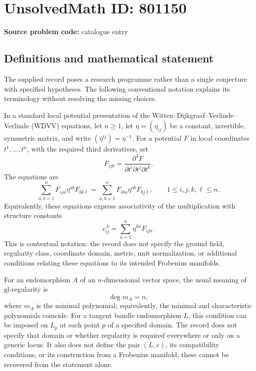 \documentclass[11pt]{article}
\begin{document}
\section*{UnsolvedMath ID: 801150}
\textbf{Source problem code:} catalogue entry
\subsection{Definitions and mathematical statement}
The supplied record poses a research programme rather than a single conjecture with specified hypotheses. The following conventional notation explains its terminology without resolving the missing choices.

In a standard local potential presentation of the Witten--Dijkgraaf--Verlinde--Verlinde (WDVV) equations, let \(n\geq 1\), let \(\eta=(\eta_{ij})\) be a constant, invertible, symmetric matrix, and write \((\eta^{ij})=\eta^{-1}\). For a potential \(F\) in local coordinates \(t^1,\ldots,t^n\), with the required third derivatives, set
\[
F_{ijk}=\frac{\partial^3 F}{\partial t^i\partial t^j\partial t^k}.
\]
The equations are
\[
\sum_{a,b=1}^{n}F_{ija}\eta^{ab}F_{bk\ell}
=
\sum_{a,b=1}^{n}F_{ika}\eta^{ab}F_{bj\ell},
\qquad 1\leq i,j,k,\ell\leq n.
\]
Equivalently, these equations express associativity of the multiplication with structure constants
\[
c_{ij}^{\ k}=\sum_{a=1}^{n}\eta^{ka}F_{ija}.
\]
This is contextual notation: the record does not specify the ground field, regularity class, coordinate domain, metric, unit normalization, or additional conditions relating these equations to its intended Frobenius manifolds.

For an endomorphism \(A\) of an \(n\)-dimensional vector space, the usual meaning of \(\mathrm{gl}\)-regularity is
\[
\deg m_A=n,
\]
where \(m_A\) is the minimal polynomial; equivalently, the minimal and characteristic polynomials coincide. For a tangent bundle endomorphism \(L\), this condition can be imposed on \(L_p\) at each point \(p\) of a specified domain. The record does not specify that domain or whether regularity is required everywhere or only on a generic locus. It also does not define the pair \((L,e)\), its compatibility conditions, or its construction from a Frobenius manifold; these cannot be recovered from the statement alone.
\end{document}
